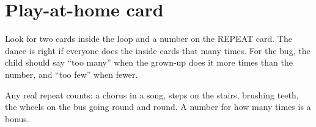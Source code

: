 \section{Play-at-home card}
\begin{answer}
Look for two cards inside the loop and a number on the REPEAT card. The dance is right if everyone does the inside cards that many times. For the bug, the child should say \enquote{too many} when the grown-up does it more times than the number, and \enquote{too few} when fewer.
\end{answer}

\begin{answer}
Any real repeat counts: a chorus in a song, steps on the stairs, brushing teeth, the wheels on the bus going round and round. A number for how many times is a bonus.
\end{answer}

